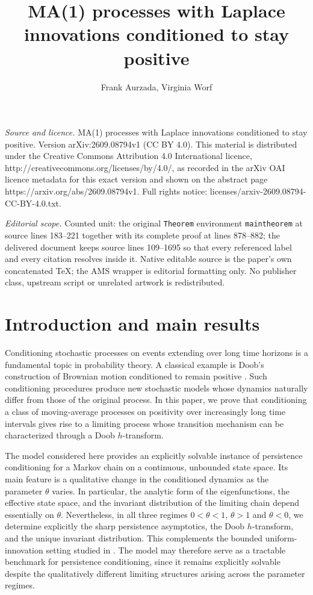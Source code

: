 \documentclass[10pt,a4paper]{amsart}
\newcommand{\1}{\mathds{1}}
\begin{document}
\title[MA(1) processes with Laplace innovations conditioned to stay]{MA(1) processes with Laplace innovations conditioned to stay positive}
\author{Frank Aurzada, Virginia Worf}
\date{}
\maketitle
\noindent\emph{Source and licence.} MA(1) processes with Laplace innovations conditioned to stay positive. Version arXiv:2609.08794v1 (CC BY 4.0). This material is distributed under the Creative Commons Attribution 4.0 International licence, http://creativecommons.org/licenses/by/4.0/, as recorded in the arXiv OAI licence metadata for this exact version and shown on the abstract page https://arxiv.org/abs/2609.08794v1. Full rights notice: licenses/arxiv-2609.08794-CC-BY-4.0.txt.\par\smallskip
\noindent\textit{Editorial scope.} Counted unit: the original \texttt{Theorem} environment \texttt{maintheorem} at source lines 183--221 together with its complete proof at lines 878--882; the delivered document keeps source lines 109--1695 so that every referenced label and every citation resolves inside it. Native editable source is the paper's own concatenated TeX; the AMS wrapper is editorial formatting only. No publisher class, upstream script or unrelated artwork is redistributed.
\section{Introduction and main results}
Conditioning stochastic processes on events extending over long time horizons is a fundamental topic in probability theory. A classical example is Doob's construction of Brownian motion conditioned to remain positive \cite{doob}. Such conditioning procedures produce new stochastic models whose dynamics naturally differ from those of the original process. In this paper, we prove that conditioning a class of moving-average processes on positivity over increasingly long time intervals gives rise to a limiting process whose transition mechanism can be characterized through a Doob $h$-transform.

The model considered here provides an explicitly solvable instance of persistence conditioning for a Markov chain on a continuous, unbounded state space. Its main feature is a qualitative change in the conditioned dynamics as the parameter $\theta$ varies. In particular, the analytic form of the eigenfunctions, the effective state space, and the invariant distribution of the limiting chain depend essentially on $\theta$.
Nevertheless, in all three regimes $0<\theta<1$, $\theta>1$ and $\theta<0$, we determine explicitly the sharp persistence asymptotics, the Doob $h$-transform, and the unique invariant distribution. This complements the bounded uniform-innovation setting studied in \cite{AW}. The model may therefore serve as a tractable benchmark for persistence conditioning, since it remains explicitly solvable despite the qualitatively different limiting structures arising across the parameter regimes.
\end{document}
